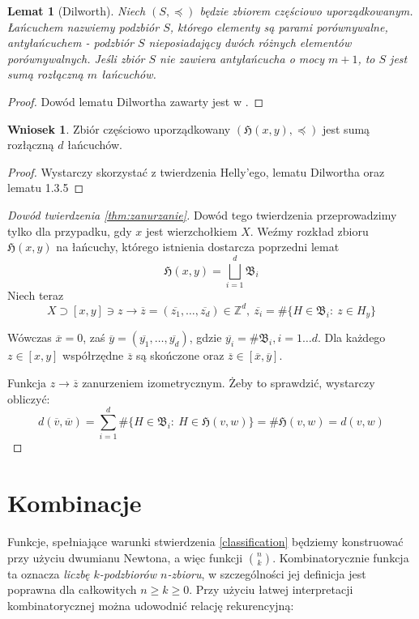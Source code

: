 \documentclass[licencjacka]{pracamgr}
\theoremstyle{definition}
\theoremstyle{definition}
\theoremstyle{definition}
\theoremstyle{definition}
\theoremstyle{definition}
\newtheorem{corollary}{Wniosek}[section]
\theoremstyle{plain}
\newtheorem{lemma}{Lemat}[section]
\theoremstyle{plain}
\begin{document}
\begin{lemma}[Dilworth]
	Niech $ (S, \preceq) $ będzie zbiorem częściowo uporządkowanym. Łańcuchem nazwiemy 
	podzbiór $S $, 
	którego elementy są parami porównywalne, antyłańcuchem - podzbiór $ S $ nieposiadający 
	dwóch różnych elementów porównywalnych. Jeśli zbiór $ S $ nie zawiera antyłańcucha 
	o mocy $ m + 1 $, to $ S $ jest sumą rozłączną $ m $ łańcuchów.
\end{lemma}
\begin{proof}
	Dowód lematu Dilwortha zawarty jest w \cite{dilworth}.
\end{proof}
\begin{corollary}
	Zbiór częściowo uporządkowany $ \left(\mathfrak{H}(x,y), \preceq \right) $ 
	jest sumą rozłączną $ d $ 
	łańcuchów.	
\end{corollary}
\begin{proof}
	Wystarczy skorzystać z twierdzenia Helly'ego, lematu Dilwortha oraz 
	lematu 1.3.5 
\end{proof}
\begin{proof}[Dowód twierdzenia \ref{thm:zanurzanie}]
	Dowód tego twierdzenia przeprowadzimy tylko dla przypadku, gdy $ x $ jest 
	wierzchołkiem $ X $. Weźmy rozkład zbioru $ \mathfrak{H}(x,y)$ na łańcuchy, którego 
	istnienia dostarcza poprzedni lemat
	 $$ \mathfrak{H}(x,y) = \bigsqcup\limits_{i=1}^{d} \mathfrak{B}_i  $$
	Niech teraz 
	$$ X \supset [x,y] \ni z \rightarrow \overline{z} = (\overline{z_1}, \dots, 
	\overline{z_d}) \in \mathbb{Z}^d, ~ \overline{z_i} = \# \{H \in \mathfrak{B}_i: ~ 
	z \in H_y\} $$

	Wówczas $ \overline{x} = 0$, zaś $ \overline{y} = (\overline{y_1}, \dots, 
	\overline{y_d}) $, gdzie $ \overline{y_i} = \# \mathfrak{B}_i, i = 1 \dots d$. 
	Dla każdego $ z \in [x,y] $ współrzędne $ \overline{z} $ są skończone oraz 
	$ \overline{z} \in [\overline{x}, \overline{y}] $.

	Funkcja $ z \rightarrow \overline{z} $ zanurzeniem izometrycznym. Żeby to sprawdzić, 
	wystarczy obliczyć:
	$$ d(\overline{v}, \overline{w}) = \sum\limits_{i=1}^d \# \{ 
	H \in \mathfrak{B}_i: ~ H \in \mathfrak{H}(v,w) \} = \# \mathfrak{H}(v,w) = 
	d(v,w)$$
\end{proof}

\section{Kombinacje}
Funkcje, spełniające warunki stwierdzenia \ref{classification} będziemy konstruować przy 
użyciu dwumianu Newtona, a więc funkcji $ {n \choose k} $. Kombinatorycznie funkcja ta 
oznacza \textit{liczbę $ k $-podzbiorów $ n $-zbioru}, w szczególności jej definicja jest 
poprawna dla całkowitych $ n \geq k \geq 0 $. Przy użyciu łatwej interpretacji 
kombinatorycznej można udowodnić relację rekurencyjną:
\end{document}
